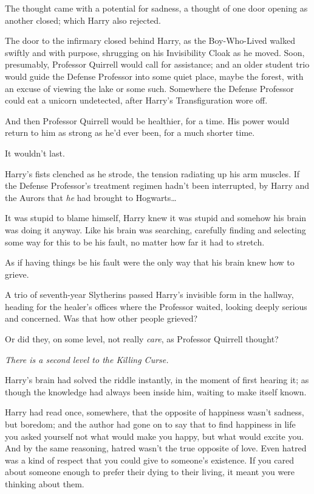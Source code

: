 The thought came with a potential for sadness, a thought of one door opening as another closed; which Harry also rejected.

\later

The door to the infirmary closed behind Harry, as the Boy-Who-Lived walked swiftly and with purpose, shrugging on his Invisibility Cloak as he moved. Soon, presumably, Professor Quirrell would call for assistance; and an older student trio would guide the Defense Professor into some quiet place, maybe the forest, with an excuse of viewing the lake or some such. Somewhere the Defense Professor could eat a unicorn undetected, after Harry's Transfiguration wore off.

And then Professor Quirrell would be healthier, for a time. His power would return to him as strong as he'd ever been, for a much shorter time.

It wouldn't last.

Harry's fists clenched as he strode, the tension radiating up his arm muscles. If the Defense Professor's treatment regimen hadn't been interrupted, by Harry and the Aurors that \emph{he} had brought to Hogwarts{\ldots}

It was stupid to blame himself, Harry knew it was stupid and somehow his brain was doing it anyway. Like his brain was searching, carefully finding and selecting some way for this to be his fault, no matter how far it had to stretch.

As if having things be his fault were the only way that his brain knew how to grieve.

A trio of seventh-year Slytherins passed Harry's invisible form in the hallway, heading for the healer's offices where the Professor waited, looking deeply serious and concerned. Was that how other people grieved?

Or did they, on some level, not really \emph{care}, as Professor Quirrell thought?

\emph{There is a second level to the Killing Curse.}

Harry's brain had solved the riddle instantly, in the moment of first hearing it; as though the knowledge had always been inside him, waiting to make itself known.

Harry had read once, somewhere, that the opposite of happiness wasn't sadness, but boredom; and the author had gone on to say that to find happiness in life you asked yourself not what would make you happy, but what would excite you. And by the same reasoning, hatred wasn't the true opposite of love. Even hatred was a kind of respect that you could give to someone's existence. If you cared about someone enough to prefer their dying to their living, it meant you were thinking about them.

